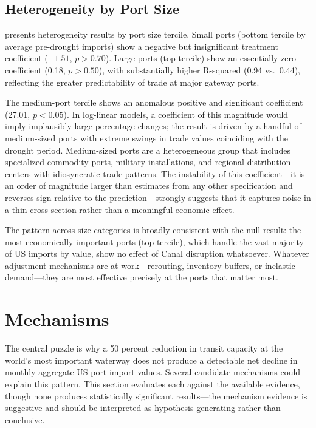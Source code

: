 \documentclass[12pt]{article}
\begin{document}



\subsection{Heterogeneity by Port Size}

 presents heterogeneity results by port size tercile. Small ports (bottom tercile by average pre-drought imports) show a negative but insignificant treatment coefficient ($-1.51$, $p > 0.70$). Large ports (top tercile) show an essentially zero coefficient (0.18, $p > 0.50$), with substantially higher R-squared (0.94 vs.\ 0.44), reflecting the greater predictability of trade at major gateway ports.

The medium-port tercile shows an anomalous positive and significant coefficient (27.01, $p < 0.05$). In log-linear models, a coefficient of this magnitude would imply implausibly large percentage changes; the result is driven by a handful of medium-sized ports with extreme swings in trade values coinciding with the drought period. Medium-sized ports are a heterogeneous group that includes specialized commodity ports, military installations, and regional distribution centers with idiosyncratic trade patterns. The instability of this coefficient---it is an order of magnitude larger than estimates from any other specification and reverses sign relative to the prediction---strongly suggests that it captures noise in a thin cross-section rather than a meaningful economic effect.

The pattern across size categories is broadly consistent with the null result: the most economically important ports (top tercile), which handle the vast majority of US imports by value, show no effect of Canal disruption whatsoever. Whatever adjustment mechanisms are at work---rerouting, inventory buffers, or inelastic demand---they are most effective precisely at the ports that matter most.




\section{Mechanisms}
\label{sec:mechanisms}

The central puzzle is why a 50 percent reduction in transit capacity at the world's most important waterway does not produce a detectable net decline in monthly aggregate US port import values. Several candidate mechanisms could explain this pattern. This section evaluates each against the available evidence, though none produces statistically significant results---the mechanism evidence is suggestive and should be interpreted as hypothesis-generating rather than conclusive.
\end{document}
